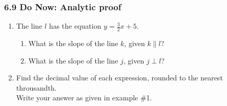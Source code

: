 \documentclass[12pt, twoside]{article}
\begin{document}
\subsubsection*{6.9 Do Now: Analytic proof}
  \begin{enumerate}
    
  \item The line $l$ has the equation $y=\frac{3}{2}x+5$.
    \begin{enumerate}
      \item What is the slope of the line $k$, given $k \parallel l$?
      \vspace{0.5cm}
      \item What is the slope of the line $j$, given $j \perp l$?
      \vspace{0.5cm}
    \end{enumerate}

  \item Find the decimal value of each expression, rounded to the nearest throusandth. \\[0.25cm]
  Write your answer as given in example \#1.
    \begin{enumerate}
    \end{enumerate}
    \vspace{1.5cm}


\end{enumerate}
\end{document}
